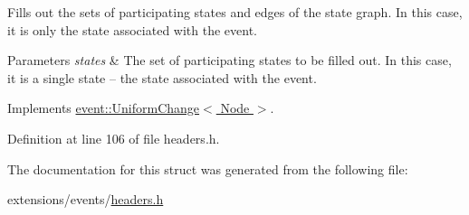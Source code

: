 Fills out the sets of participating states and edges of the state graph. In this case, it is only the state associated with the event. 


\begin{DoxyParams}{Parameters}
{\em states} & The set of participating states to be filled out. In this case, it is a single state -- the state associated with the event. \\
\hline
\end{DoxyParams}


Implements \hyperlink{structevent_1_1UniformChange_a582bd18d2ec423a5baf7e6b9263ae762}{event\+::\+Uniform\+Change$<$ Node $>$}.



Definition at line 106 of file headers.\+h.



The documentation for this struct was generated from the following file\+:\begin{DoxyCompactItemize}
\item 
extensions/events/\hyperlink{extensions_2events_2headers_8h}{headers.\+h}\end{DoxyCompactItemize}
